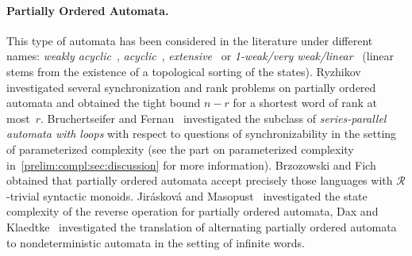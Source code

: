 \paragraph{Partially Ordered Automata.}
This type of automata has been considered in the literature
under different names: \emph{weakly acyclic}~\cite{Ryzhikov19a}, \emph{acyclic}~\cite{DBLP:conf/wia/JiraskovaM12},
\emph{extensive}~\cite{Pin2022}
or \emph{1-weak/very weak/linear}~\cite{DBLP:conf/lpar/DaxK08} (linear stems from the existence of a topological sorting of the states).
Ryzhikov~\cite{Ryzhikov19a} investigated several synchronization
and rank problems on partially ordered automata
and obtained the tight bound $n - r$ for a shortest word of rank at most~$r$.
Bruchertseifer and Fernau~\cite{DBLP:journals/ita/BruchertseiferF21}
investigated the subclass of \emph{series-parallel automata with loops}
with respect to questions of synchronizability in the setting of
parameterized complexity (see the part on parameterized complexity in~\cref{prelim:compl:sec:discussion} for more information). 
\mbox{Brzozowski} and Fich~\cite{DBLP:journals/jcss/BrzozowskiF80}
obtained that partially ordered automata
accept precisely those languages with $\mathcal R$-trivial syntactic monoids.
Jir\'askov\'a and Masopust~\cite{DBLP:conf/wia/JiraskovaM12} 
investigated the state complexity of the reverse operation for partially ordered automata,
Dax and Klaedtke~\cite{DBLP:conf/lpar/DaxK08} investigated
the translation of alternating partially ordered automata to nondeterministic automata
in the setting of infinite words.

\label{discussion:monotonic}
